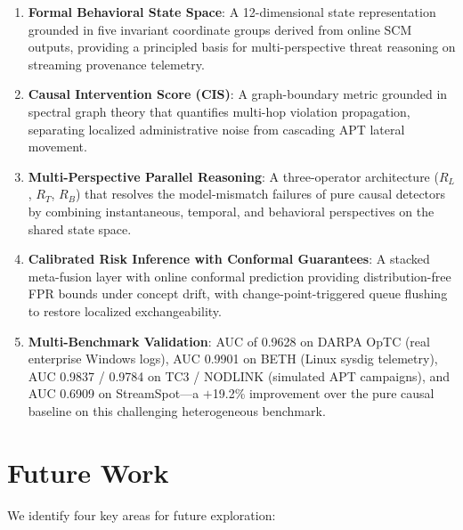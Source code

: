 \begin{enumerate}
\item \textbf{Formal Behavioral State Space}: A 12-dimensional state representation grounded in
    five invariant coordinate groups derived from online SCM outputs, providing a principled
    basis for multi-perspective threat reasoning on streaming provenance telemetry.

\item \textbf{Causal Intervention Score (CIS)}: A graph-boundary metric grounded in spectral
    graph theory that quantifies multi-hop violation propagation, separating localized
    administrative noise from cascading APT lateral movement.

\item \textbf{Multi-Perspective Parallel Reasoning}: A three-operator architecture ($R_L$,
    $R_T$, $R_B$) that resolves the model-mismatch failures of pure causal detectors by
    combining instantaneous, temporal, and behavioral perspectives on the shared state space.

\item \textbf{Calibrated Risk Inference with Conformal Guarantees}: A stacked meta-fusion layer
    with online conformal prediction providing distribution-free FPR bounds under concept drift,
    with change-point-triggered queue flushing to restore localized exchangeability.

\item \textbf{Multi-Benchmark Validation}: AUC of 0.9628 on DARPA OpTC (real enterprise Windows
    logs), AUC 0.9901 on BETH (Linux sysdig telemetry), AUC 0.9837 / 0.9784 on TC3 / NODLINK
    (simulated APT campaigns), and AUC 0.6909 on StreamSpot---a $+$19.2\% improvement over the
    pure causal baseline on this challenging heterogeneous benchmark.
\end{enumerate}


\section{Future Work}

We identify four key areas for future exploration:

